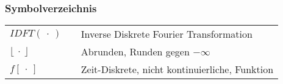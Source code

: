 
\setcounter{page}{1}

\newpage

\thispagestyle{empty}
\clearpage\null
\newpage
\pagestyle{plain}

\setcounter{page}{1}


\newpage

\tableofcontents

\newpage



\listoffigures

\newpage

\listofequations

\newpage

\printacronyms

\newpage

\printglossary[]

\newpage

\subsubsection*{Symbolverzeichnis}

\begin{tabularx}{\linewidth}{l p{1.5cm} l}
$\textit{IDFT}\left(\ \cdot\ \right)$ && Inverse Diskrete Fourier Transformation \\
$\lfloor\ \cdot\ \rfloor$ && Abrunden, Runden gegen $-\infty$ \\
$f\left[\ \cdot \ \right]$ && Zeit-Diskrete, nicht kontinuierliche, Funktion
\end{tabularx}

